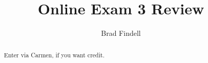 \documentclass[handout,space,nooutcomes]{xourse}
\title{Online Exam 3 Review}
\author{Brad Findell}
\begin{document}
\begin{abstract}
Enter via Carmen, if you want credit.  
\end{abstract}
\maketitle

\end{document}
